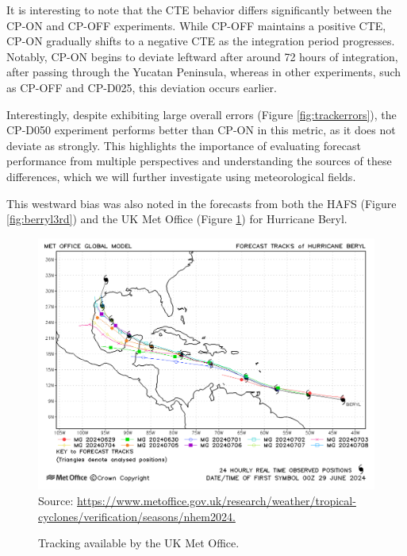 It is interesting to note that the CTE behavior differs significantly between the CP-ON and CP-OFF experiments. While CP-OFF maintains a positive CTE, CP-ON gradually shifts to a negative CTE as the integration period progresses. Notably, CP-ON begins to deviate leftward after around 72 hours of integration, after passing through the Yucatan Peninsula, whereas in other experiments, such as CP-OFF and CP-D025, this deviation occurs earlier.

Interestingly, despite exhibiting large overall errors (Figure \ref{fig:trackerrors}), the CP-D050 experiment performs better than CP-ON in this metric, as it does not deviate as strongly. This highlights the importance of evaluating forecast performance from multiple perspectives and understanding the sources of these differences, which we will further investigate using meteorological fields.

This westward bias was also noted in the forecasts from both the HAFS (Figure \ref{fig:berryl3rd}) and the UK Met Office  (Figure \ref{fig:metoff}) for Hurricane Beryl.

\begin{figure}[!ht]
	\centering
	\caption{Tracking available by the UK Met Office.} %
	\includegraphics[width=\textwidth]{docs/figuras/chapter5/MetOffice.png} 
	\vspace{0.5em}
	Source: \url{https://www.metoffice.gov.uk/research/weather/tropical-cyclones/verification/seasons/nhem2024.}  %
	\label{fig:metoff} %
\end{figure}


